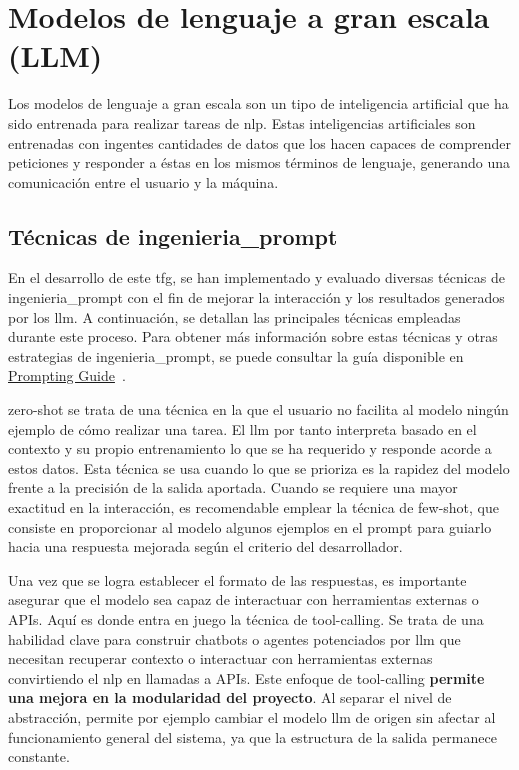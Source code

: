 \section{Modelos de lenguaje a gran escala (LLM)}
Los modelos de lenguaje a gran escala son un tipo de inteligencia artificial que ha sido entrenada para realizar tareas de \acrfull{nlp}. Estas inteligencias artificiales son entrenadas con ingentes cantidades de datos que los hacen capaces de comprender peticiones y responder a éstas en los mismos términos de lenguaje, generando una comunicación entre el usuario y la máquina.

	\subsection{Técnicas de \gls{ingenieria_prompt}}
	En el desarrollo de este \acrshort{tfg}, se han implementado y evaluado diversas técnicas de \gls{ingenieria_prompt} con el fin de mejorar la interacción y los resultados generados por los \acrshort{llm}. A continuación, se detallan las principales técnicas empleadas durante este proceso. Para obtener más información sobre estas técnicas y otras estrategias de \gls{ingenieria_prompt}, se puede consultar la guía disponible en \href{https://www.promptingguide.ai/es}{Prompting Guide}~\cite{promptingguide}.

	\gls{zero-shot} se trata de una técnica en la que el usuario no facilita al modelo ningún ejemplo de cómo realizar una tarea. El \acrshort{llm} por tanto interpreta basado en el contexto y su propio entrenamiento lo que se ha requerido y responde acorde a estos datos. Esta técnica se usa cuando lo que se prioriza es la rapidez del modelo frente a la precisión de la salida aportada. Cuando se requiere una mayor exactitud en la interacción, es recomendable emplear la técnica de \gls{few-shot}, que consiste en proporcionar al modelo algunos ejemplos en el prompt para guiarlo hacia una respuesta mejorada según el criterio del desarrollador.

	Una vez que se logra establecer el formato de las respuestas, es importante asegurar que el modelo sea capaz de interactuar con herramientas externas o APIs. Aquí es donde entra en juego la técnica de \gls{tool-calling}.
	Se trata de una habilidad clave para construir chatbots o agentes potenciados por \acrshort{llm} que necesitan recuperar contexto o interactuar con herramientas externas convirtiendo el \acrlong{nlp} en llamadas a APIs.
	Este enfoque de \gls{tool-calling} \textbf{permite una mejora en la modularidad del proyecto}. Al separar el nivel de abstracción, permite por ejemplo cambiar el modelo \acrshort{llm} de origen sin afectar al funcionamiento general del sistema, ya que la estructura de la salida permanece constante.

